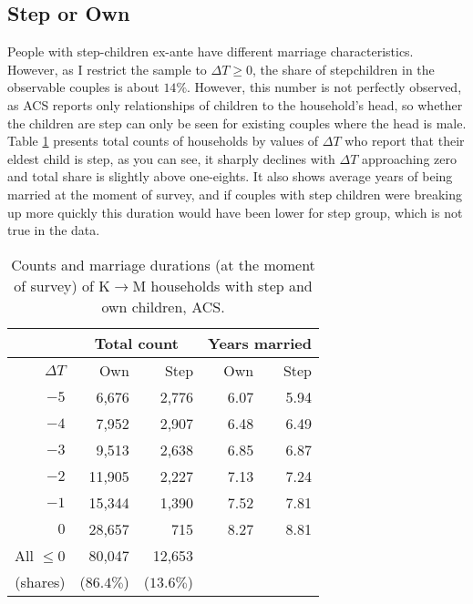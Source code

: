 \documentclass[12pt,letter]{article}
\begin{document}
\subsection{Step or Own\label{step-part}}
People with step-children ex-ante have different marriage characteristics. However, as I restrict the sample to $\Delta T \geq 0$, the share of stepchildren in the observable couples is about $14\%$. However, this number is not perfectly observed, as ACS reports only relationships of children to the household's head, so whether the children are step can only be seen for existing couples where the head is male. Table \ref{step-1} presents total counts of households by values of $\Delta T$ who report that their eldest child is step, as you can see, it sharply declines with $\Delta T$ approaching zero and total share is slightly above one-eights. It also shows average years of being married at the moment of survey, and if couples with step children were breaking up more quickly this duration would have been lower for step group, which is not true in the data.
\begin{table}
\centering
\begin{tabular}{|r|r|r||r|r|}\hline
& \multicolumn{2}{c||}{Total count} & \multicolumn{2}{c|}{Years married} \\\hline
 $\Delta T$ &  Own & Step & Own & Step\\\hline
        $-5$ &     6,676  &     2,776 & 6.07  & 5.94\\
        $-4$ &     7,952  &    2,907 & 6.48 &  6.49  \\
        $-3$ &     9,513  &    2,638 & 6.85 & 6.87\\
        $-2$ &    11,905 &     2,227 & 7.13   & 7.24\\
        $-1$ &     15,344 &    1,390 &  7.52  & 7.81 \\
         $0$  &  28,657  &      715  & 8.27  & 8.81 \\\hline
     All $\leq 0$ &    80,047 &    12,653 \\
     (shares)        & ($86.4\%$)  & ($13.6\%$)\\\cline{1-3}
\end{tabular}
\caption{Counts and marriage durations (at the moment of survey) of K$\to$M households with step and own children, ACS.\label{step-1}}
\end{table}

\end{document}
